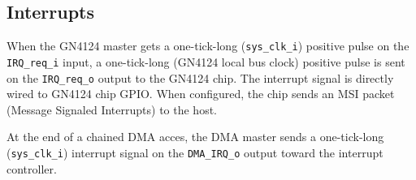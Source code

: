 \documentclass[10pt,a4paper]{cerndoc}
\begin{document}
   \subsection{Interrupts}
   When the GN4124 master gets a one-tick-long (\verb+sys_clk_i+) positive pulse on the \verb+IRQ_req_i+ input, a one-tick-long (GN4124 local bus clock) positive pulse is sent on the \verb+IRQ_req_o+ output to the GN4124 chip. The interrupt signal is directly wired to GN4124 chip GPIO. When configured, the chip sends an MSI packet (Message Signaled Interrupts) to the host.
   
   At the end of a chained DMA acces, the DMA master sends a one-tick-long (\verb+sys_clk_i+) interrupt signal on the \verb+DMA_IRQ_o+ output toward the interrupt controller.
\end{document}
